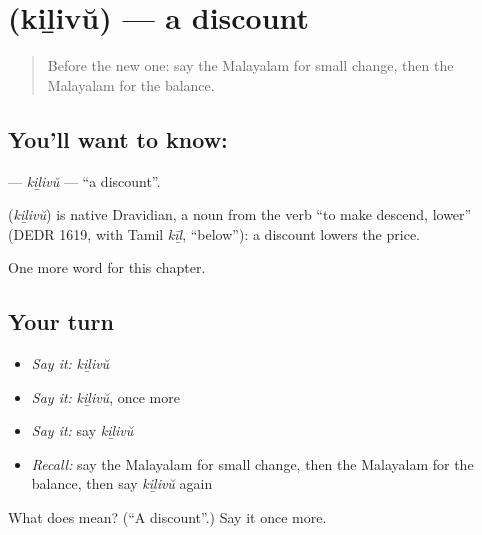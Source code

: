 \section[\texorpdfstring{\ml{കിഴിവ്} (kiḻivŭ)}{കിഴിവ് (kiḻivŭ)}]{ (kiḻivŭ) — a discount}

\label{lesson:ML-C219-kilivu}



\begin{quote}
Before the new one: say the Malayalam for small change, then the Malayalam for the balance.
\end{quote}

\subsection*{You'll want to know: }
\textbf{} — \emph{kiḻivŭ} — \textquotedblleft{}a discount\textquotedblright{}.

\begin{cousinweb}
\textbf{} (\emph{kiḻivŭ}) is native Dravidian, a noun from the verb \textquotedblleft{}to make descend, lower\textquotedblright{} (DEDR 1619, with Tamil \emph{kīḻ}, \textquotedblleft{}below\textquotedblright{}): a discount lowers the price.
\end{cousinweb}

\begin{grammarlens}[title={What you've built}]
One more word for this chapter.
\end{grammarlens}

\subsection*{Your turn}
\begin{itemize}
\raggedright
  \item \emph{Say it:} \emph{kiḻivŭ}
  \item \emph{Say it:} \emph{kiḻivŭ}, once more
  \item \emph{Say it:} say \emph{kiḻivŭ}
  \item \emph{Recall:} say the Malayalam for small change, then the Malayalam for the balance, then say \emph{kiḻivŭ} again
\end{itemize}

\begin{tcolorbox}[breakable,colback=teal!4,colframe=teal!35!black,title={Before you move on}]
What does  mean? (\textquotedblleft{}A discount\textquotedblright{}.) Say it once more.
\end{tcolorbox}
